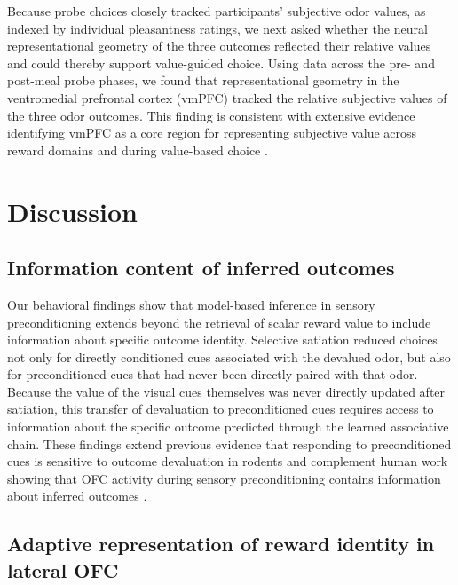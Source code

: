 \documentclass[12pt,letterpaper]{article}
\begin{document}
Because probe choices closely tracked participants’ subjective odor values, as indexed by individual pleasantness ratings, we next asked whether the neural representational geometry of the three outcomes reflected their relative values and could thereby support value-guided choice. Using data across the pre- and post-meal probe phases, we found that representational geometry in the ventromedial prefrontal cortex (vmPFC) tracked the relative subjective values of the three odor outcomes. This finding is consistent with extensive evidence identifying vmPFC as a core region for representing subjective value across reward domains and during value-based choice \cite{levy2012root,bartra2013valuation}.


\section*{Discussion}



\subsection*{Information content of inferred outcomes}

Our behavioral findings show that model-based inference in sensory preconditioning extends beyond the retrieval of scalar reward value to include information about specific outcome identity. Selective satiation reduced choices not only for directly conditioned cues associated with the devalued odor, but also for preconditioned cues that had never been directly paired with that odor. Because the value of the visual cues themselves was never directly updated after satiation, this transfer of devaluation to preconditioned cues requires access to information about the specific outcome predicted through the learned associative chain. These findings extend previous evidence that responding to preconditioned cues is sensitive to outcome devaluation in rodents \cite{hart20} and complement human work showing that OFC activity during sensory preconditioning contains information about inferred outcomes \cite{wang2020interactions}. 


\subsection*{Adaptive representation of reward identity in lateral OFC}
\end{document}
